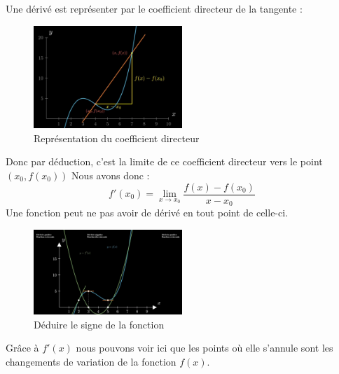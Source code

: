 \documentclass[12]{article}%
\theoremstyle{plain}
\theoremstyle{definition}
\theoremstyle{remark}
\begin{document}
Une dérivé est représenter par le coefficient directeur de la tangente :
\begin{figure}[h] %
	\centering
	\includegraphics[width=0.5\textwidth]{./images/coef_directeur.png} %
	\caption{Représentation du coefficient directeur}
	\label{fig:coef_directeur} %
\end{figure}

Donc par déduction, c'est la limite de ce coefficient directeur vers le point $(x_{0}, f(x_{0}))$ \newline
Nous avons donc :
\[
\boxed{ f'(x_{0}) = \lim\limits_{x \to x_{0}} \frac{f(x)-f(x_{0})}{x-x_{0}} }
\]
Une fonction peut ne pas avoir de dérivé en tout point de celle-ci.\newline


\begin{figure}[H] %
	\centering
	\includegraphics[width=0.5\textwidth]{./images/variations.png} %
	\caption{Déduire le signe de la fonction}
	\label{fig:variations} %
\end{figure}

Grâce à $f'(x)$ nous pouvons voir ici que les points où elle s'annule sont les changements de variation de la fonction $f(x)$.

\newpage
\end{document}
